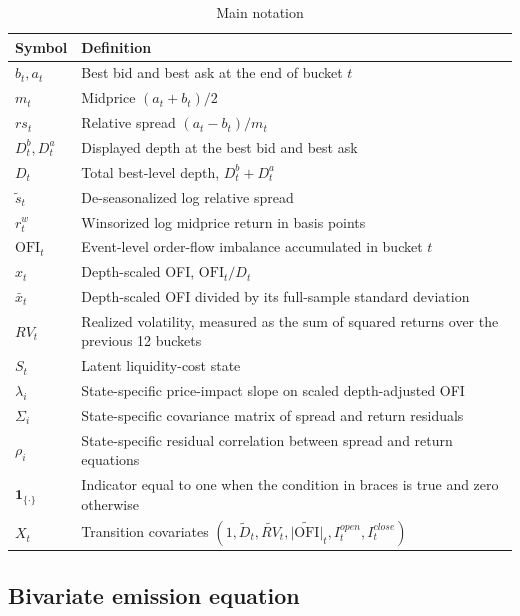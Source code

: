 \documentclass[12pt,a4paper]{article}
\newcommand{\OFI}{\mathrm{OFI}}
\begin{document}
\begin{table}[htbp]
\centering
\caption{Main notation}
\small
\begin{tabularx}{\textwidth}{L{0.22\textwidth}X}
\toprule
\textbf{Symbol} & \textbf{Definition} \\
\midrule
\(b_t,a_t\) & Best bid and best ask at the end of bucket \(t\) \\
\(m_t\) & Midprice \((a_t+b_t)/2\) \\
\(rs_t\) & Relative spread \((a_t-b_t)/m_t\) \\
\(D^b_t,D^a_t\) & Displayed depth at the best bid and best ask \\
\(D_t\) & Total best-level depth, \(D^b_t+D^a_t\) \\
\(\tilde{s}_t\) & De-seasonalized log relative spread \\
\(r_t^w\) & Winsorized log midprice return in basis points \\
\(\OFI_t\) & Event-level order-flow imbalance accumulated in bucket \(t\) \\
\(x_t\) & Depth-scaled OFI, \(\OFI_t/D_t\) \\
\(\bar{x}_t\) & Depth-scaled OFI divided by its full-sample standard deviation \\
\(RV_t\) & Realized volatility, measured as the sum of squared returns over the previous 12 buckets \\
\(S_t\) & Latent liquidity-cost state \\
\(\lambda_i\) & State-specific price-impact slope on scaled depth-adjusted OFI \\
\(\Sigma_i\) & State-specific covariance matrix of spread and return residuals \\
\(\rho_i\) & State-specific residual correlation between spread and return equations \\
\(\mathbf{1}_{\{\cdot\}}\) & Indicator equal to one when the condition in braces is true and zero otherwise \\
\(X_t\) & Transition covariates \((1,\tilde{D}_t,\widetilde{RV}_t,\widetilde{|\OFI|}_t,I^{open}_t,I^{close}_t)\) \\
\bottomrule
\end{tabularx}
\label{tab:notation}
\end{table}

\subsection{Bivariate emission equation}\label{sec:emission}
\end{document}
